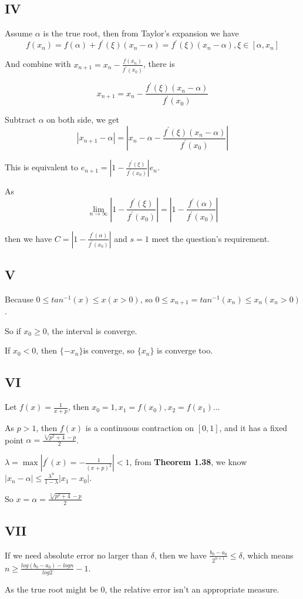 \documentclass[12]{article}%
\begin{document}
        \subsection{IV}
            Assume $\alpha$ is the true root, then from Taylor's expansion we have
            $$
f(x_n)=f(\alpha)+f^{'}(\xi)(x_n-\alpha)=f^{'}(\xi)(x_n-\alpha),\xi\in [\alpha,x_n]
            $$

            And combine with $x_{n+1}=x_n-\frac{f(x_n)}{f^{'}(x_0)}$, there is 

            $$
x_{n+1}=x_n-\frac{f^{'}(\xi)(x_n-\alpha)}{f^{'}(x_0)}
            $$

            Subtract $\alpha$ on both side, we get
            $$
            |x_{n+1}-\alpha|=|x_n-\alpha-\frac{f^{'}(\xi)(x_n-\alpha)}{f^{'}(x_0)}|
            $$

            This is equivalent to $e_{n+1}=|1-\frac{f^{'}(\xi)}{f^{'}(x_0)}|e_n$.

            As $$\lim_{n\to \infty} |1-\frac{f^{'}(\xi)}{f^{'}(x_0)}|=|1-\frac{f^{'}(\alpha)}{f^{'}(x_0)}|$$

            then we have $C=|1-\frac{f^{'}(\alpha)}{f^{'}(x_0)}|$ and $s=1$ meet the question's requirement.

        \subsection{V}
            Because $0 \le tan^{-1}(x) \le x(x>0)$, so $0\le x_{n+1}=tan^{-1}(x_n)\le x_n(x_n>0)$.

            So if $x_0 \ge 0$, the interval is converge.

            If $x_0 <0 $, then $\{-x_n\}$is converge, so $\{x_n\}$ is converge too.

        \subsection{VI}
            Let $f(x)=\frac{1}{x+p}$, then $x_0=1,x_1=f(x_0),x_2=f(x_1)\dots$

            As $p>1$, then $f(x)$ is a continuous contraction on $[0,1]$, and it has a fixed point $\alpha = \frac{\sqrt[2]{p^2+4}-p}{2}$.

            $\lambda = \max |f^{'}(x)=-\frac{1}{(x+p)^2}|<1$, from \textbf{Theorem 1.38}, we know $|x_n-\alpha|\le\frac{\lambda^n}{1-\lambda}|x_1-x_0|$.

            So $x=\alpha=\frac{\sqrt[2]{p^2+4}-p}{2}$

        \subsection{VII}
            If we need absolute error no larger than $\delta$, then we have $\frac{b_0-a_0}{2^{n+1}}\le \delta$, which means $n \ge \frac{log(b_0-a_0)-logn}{log2} -1$.

            As the true root might be $0$, the relative error isn't an appropriate measure.
\end{document}
